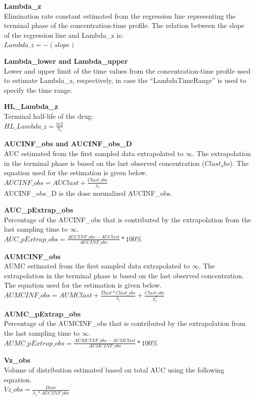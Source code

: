 \documentclass[12pt,]{krantz}
\begin{document}
\textbf{Lambda\_z}\\
Elimination rate constant estimated from the regression line representing the terminal phase of the concentration-time profile. The relation between the slope of the regression line and Lambda\_z is:\\
\(Lambda\_z = -(slope)\)

\textbf{Lambda\_lower and Lambda\_upper}\\
Lower and upper limit of the time values from the concentration-time profile used to estimate Lambda\_z, respectively, in case the ``LambdaTimeRange'' is used to specify the time range.

\textbf{HL\_Lambda\_z}\\
Terminal half-life of the drug:\\
\(HL\_Lambda\_z = \frac{ln2}{\lambda_z}\)

\textbf{AUCINF\_obs and AUCINF\_obs\_D}\\
AUC estimated from the first sampled data extrapolated to \({\infty}\). The extrapolation in the terminal phase is based on the last observed concentration (\({Clast_obs}\)). The equation used for the estimation is given below.\\
\(AUCINF\_obs = AUClast+\frac{Clast\_obs}{\lambda_z}\)\\
AUCINF\_obs\_D is the dose normalized AUCINF\_obs.

\textbf{AUC\_pExtrap\_obs}\\
Percentage of the AUCINF\_obs that is contributed by the extrapolation from the last sampling time to \({\infty}\).\\
\(AUC\_pExtrap\_obs = \frac{AUCINF\_obs-AUClast}{AUCINF\_obs}*100\%\)

\textbf{AUMCINF\_obs}\\
AUMC estimated from the first sampled data extrapolated to \({\infty}\). The extrapolation in the terminal phase is based on the last observed concentration. The equation used for the estimation is given below.\\
\(AUMCINF\_obs = AUMClast+\frac{Tlast*Clast\_obs}{\lambda_z}+\frac{Clast\_obs}{\lambda_{z}^2}\)

\textbf{AUMC\_pExtrap\_obs}\\
Percentage of the AUMCINF\_obs that is contributed by the extrapolation from the last sampling time to \({\infty}\).\\
\(AUMC\_pExtrap\_obs = \frac{AUMCINF\_obs-AUMClast}{AUMCINF\_obs}*100\%\)

\textbf{Vz\_obs}\\
Volume of distribution estimated based on total AUC using the following equation.\\
\(Vz\_obs = \frac{Dose}{\lambda_z*AUCINF\_obs}\)
\end{document}

